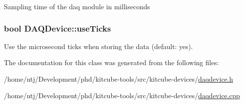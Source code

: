Sampling time of the daq module in milliseconds \hypertarget{classDAQDevice_a6103f8804ccb23ac0e76e38ed954ddbc}{
\subsubsection[{use\-Ticks}]{\setlength{\rightskip}{0pt plus 5cm}bool D\-A\-Q\-Device\-::use\-Ticks\hspace{0.3cm}{\ttfamily [protected]}}}\label{classDAQDevice_a6103f8804ccb23ac0e76e38ed954ddbc}
Use the microsecond ticks when storing the data (default\-: yes). 

The documentation for this class was generated from the following files\-:\begin{DoxyCompactItemize}
\item 
/home/ntj/\-Development/phd/kitcube-\/tools/src/kitcube-\/devices/\hyperlink{daqdevice_8h}{daqdevice.\-h}\item 
/home/ntj/\-Development/phd/kitcube-\/tools/src/kitcube-\/devices/\hyperlink{daqdevice_8cpp}{daqdevice.\-cpp}\end{DoxyCompactItemize}
